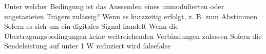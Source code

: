     {Unter welcher Bedingung ist das Aussenden eines unmodulierten oder ungetasteten Trägers zulässig?}
    {Wenn es kurzzeitig erfolgt, z. B. zum Abstimmen}
    {Sofern es sich um ein digitales Signal handelt}
    {Wenn die Übertragungsbedingungen keine weitreichenden Verbindungen zulassen}
    {Sofern die Sendeleistung auf unter 1 W reduziert wird}
    {false}{false}